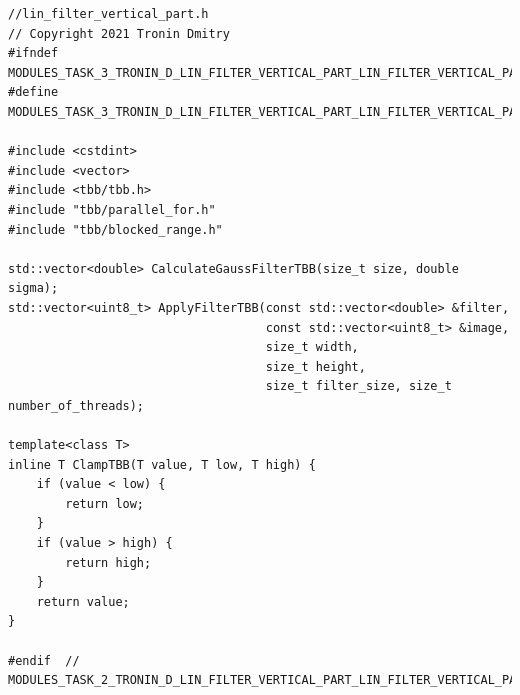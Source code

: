 \documentclass{report}
\begin{document}
\begin{lstlisting}[breaklines=true]
//lin_filter_vertical_part.h
// Copyright 2021 Tronin Dmitry
#ifndef MODULES_TASK_3_TRONIN_D_LIN_FILTER_VERTICAL_PART_LIN_FILTER_VERTICAL_PART_H_
#define MODULES_TASK_3_TRONIN_D_LIN_FILTER_VERTICAL_PART_LIN_FILTER_VERTICAL_PART_H_

#include <cstdint>
#include <vector>
#include <tbb/tbb.h>
#include "tbb/parallel_for.h"
#include "tbb/blocked_range.h"

std::vector<double> CalculateGaussFilterTBB(size_t size, double sigma);
std::vector<uint8_t> ApplyFilterTBB(const std::vector<double> &filter,
                                    const std::vector<uint8_t> &image,
                                    size_t width,
                                    size_t height,
                                    size_t filter_size, size_t number_of_threads);

template<class T>
inline T ClampTBB(T value, T low, T high) {
    if (value < low) {
        return low;
    }
    if (value > high) {
        return high;
    }
    return value;
}

#endif  // MODULES_TASK_2_TRONIN_D_LIN_FILTER_VERTICAL_PART_LIN_FILTER_VERTICAL_PART_H_
\end{lstlisting}
\end{document}
